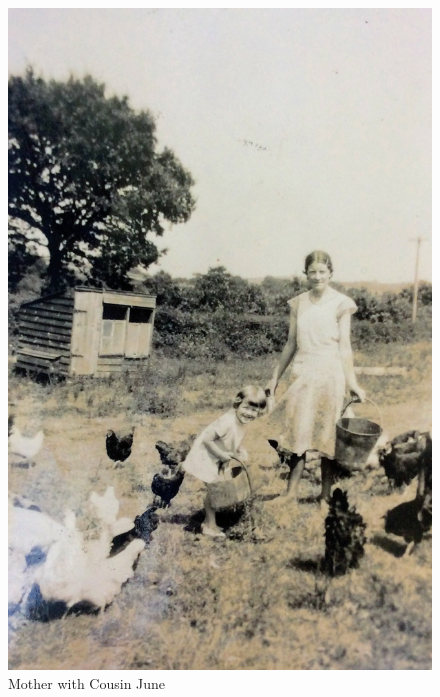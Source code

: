 \begin{figure}
  \centering
  \includegraphics[width=.9\linewidth]{pictures/cropped/Mother with Cousin June.jpg}
  \caption*{Mother with Cousin June}
\end{figure}

